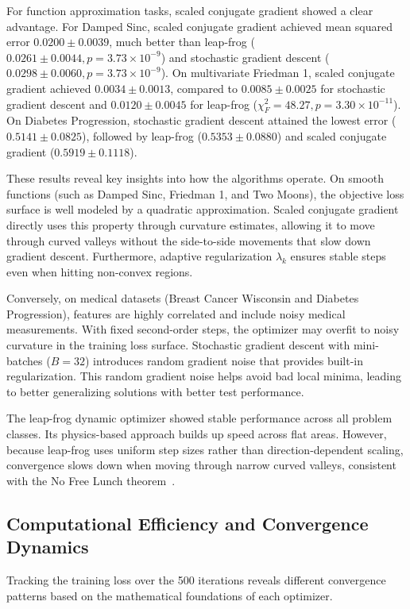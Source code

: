 \documentclass[conference,10pt]{IEEEtran}
\begin{document}
For function approximation tasks, scaled conjugate gradient showed a clear advantage. For Damped Sinc, scaled conjugate gradient achieved mean squared error $0.0200 \pm 0.0039$, much better than leap-frog ($0.0261 \pm 0.0044, p = 3.73 \times 10^{-9}$) and stochastic gradient descent ($0.0298 \pm 0.0060, p = 3.73 \times 10^{-9}$). On multivariate Friedman 1, scaled conjugate gradient achieved $0.0034 \pm 0.0013$, compared to $0.0085 \pm 0.0025$ for stochastic gradient descent and $0.0120 \pm 0.0045$ for leap-frog ($\chi_F^2 = 48.27, p = 3.30 \times 10^{-11}$). On Diabetes Progression, stochastic gradient descent attained the lowest error ($0.5141 \pm 0.0825$), followed by leap-frog ($0.5353 \pm 0.0880$) and scaled conjugate gradient ($0.5919 \pm 0.1118$).

These results reveal key insights into how the algorithms operate. On smooth functions (such as Damped Sinc, Friedman 1, and Two Moons), the objective loss surface is well modeled by a quadratic approximation. Scaled conjugate gradient directly uses this property through curvature estimates, allowing it to move through curved valleys without the side-to-side movements that slow down gradient descent. Furthermore, adaptive regularization $\lambda_k$ ensures stable steps even when hitting non-convex regions.

Conversely, on medical datasets (Breast Cancer Wisconsin and Diabetes Progression), features are highly correlated and include noisy medical measurements. With fixed second-order steps, the optimizer may overfit to noisy curvature in the training loss surface. Stochastic gradient descent with mini-batches ($B = 32$) introduces random gradient noise that provides built-in regularization. This random gradient noise helps avoid bad local minima, leading to better generalizing solutions with better test performance.

The leap-frog dynamic optimizer showed stable performance across all problem classes. Its physics-based approach builds up speed across flat areas. However, because leap-frog uses uniform step sizes rather than direction-dependent scaling, convergence slows down when moving through narrow curved valleys, consistent with the No Free Lunch theorem~\cite{wolpert1997}.

\subsection{Computational Efficiency and Convergence Dynamics}
Tracking the training loss over the 500 iterations reveals different convergence patterns based on the mathematical foundations of each optimizer.
\end{document}
